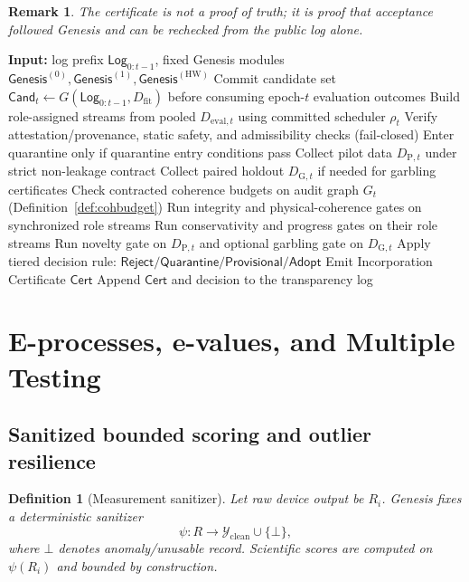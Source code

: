 \documentclass[11pt,a4paper]{article}
\newtheorem{definition}{Definition}[section]
\newtheorem{remark}{Remark}[section]
\newcommand{\Log}{\mathsf{Log}}
\newcommand{\Cert}{\mathsf{Cert}}
\newcommand{\Gen}{\mathsf{Genesis}}
\newcommand{\Rej}{\mathsf{Reject}}
\newcommand{\Quar}{\mathsf{Quarantine}}
\newcommand{\Prov}{\mathsf{Provisional}}
\newcommand{\Adopt}{\mathsf{Adopt}}
\newcommand{\Cand}{\mathsf{Cand}}
\begin{document}
\begin{remark}
The certificate is not a proof of truth; it is proof that acceptance followed Genesis and can be rechecked from the public log alone.
\end{remark}

\begin{algorithm}[H]
\caption{Audit-Closed Epistemic Incorporation (tiered)}
\begin{algorithmic}[1]
\State \textbf{Input:} log prefix $\Log_{0:t-1}$, fixed Genesis modules $\Gen^{(0)},\Gen^{(1)},\Gen^{(\mathrm{HW})}$
\State Commit candidate set $\Cand_t \gets G(\Log_{0:t-1}, D_{\mathrm{fit}})$ before consuming epoch-$t$ evaluation outcomes
\State Build role-assigned streams from pooled $D_{\mathrm{eval},t}$ using committed scheduler $\rho_t$
\For{each candidate $c\in\Cand_t$}
  \State Verify attestation/provenance, static safety, and admissibility checks (fail-closed)
    \State Enter quarantine only if quarantine entry conditions pass
    \State Collect pilot data $D_{\mathrm{P},t}$ under strict non-leakage contract
    \State Collect paired holdout $D_{\mathrm{G},t}$ if needed for garbling certificates
  \EndIf
  \State Check contracted coherence budgets on audit graph $G_t$ (Definition~\ref{def:cohbudget})
  \State Run integrity and physical-coherence gates on synchronized role streams
  \State Run conservativity and progress gates on their role streams
    \State Run novelty gate on $D_{\mathrm{P},t}$ and optional garbling gate on $D_{\mathrm{G},t}$
  \EndIf
  \State Apply tiered decision rule: $\Rej/\Quar/\Prov/\Adopt$
  \State Emit Incorporation Certificate $\Cert$
  \State Append $\Cert$ and decision to the transparency log
\EndFor
\end{algorithmic}
\end{algorithm}


\section{E-processes, e-values, and Multiple Testing}

\subsection{Sanitized bounded scoring and outlier resilience}
\begin{definition}[Measurement sanitizer]
Let raw device output be $R_i$.
Genesis fixes a deterministic sanitizer
\[
\psi:R\to \mathcal{Y}_{\mathrm{clean}}\cup\{\bot\},
\]
where $\bot$ denotes anomaly/unusable record.
Scientific scores are computed on $\psi(R_i)$ and bounded by construction.
\end{definition}
\end{document}
